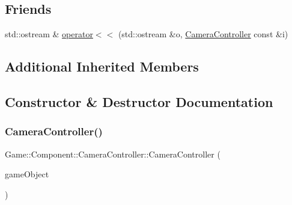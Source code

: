 \subsection*{Friends}
\begin{DoxyCompactItemize}
\item 
std\+::ostream \& \mbox{\hyperlink{class_game_1_1_component_1_1_camera_controller_a5746cb5b8916dd3839a38b83018ae1ac}{operator$<$$<$}} (std\+::ostream \&o, \mbox{\hyperlink{class_game_1_1_component_1_1_camera_controller}{Camera\+Controller}} const \&i)
\end{DoxyCompactItemize}
\subsection*{Additional Inherited Members}


\subsection{Constructor \& Destructor Documentation}
\mbox{\label{class_game_1_1_component_1_1_camera_controller_ac9ced75e848e973c4a2f25e25059a4f7}} 
\subsubsection{\texorpdfstring{Camera\+Controller()}{CameraController()}}
{\footnotesize\ttfamily Game\+::\+Component\+::\+Camera\+Controller\+::\+Camera\+Controller (\begin{DoxyParamCaption}\item[{\mbox{\hyperlink{class_beer_engine_1_1_game_object}{Beer\+Engine\+::\+Game\+Object}} $\ast$}]{game\+Object }\end{DoxyParamCaption})}

\mbox{\label{class_game_1_1_component_1_1_camera_controller_a6cbf885ec5705638f392a40bb762bd9c}} 
